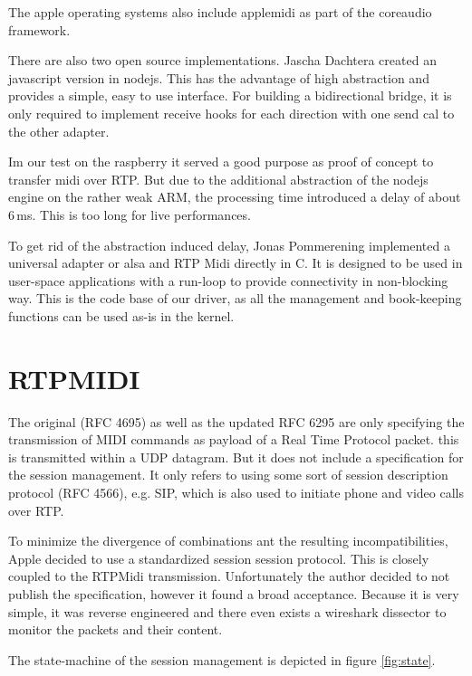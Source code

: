 \documentclass[paper=a4,fontsize=11pt,twocolumn,pagesize,bibtotoc]{scrartcl}
\begin{document}
	The apple operating systems also include applemidi as part of the coreaudio framework.
	
	There are also two open source implementations. 
	Jascha Dachtera created an javascript version in nodejs. This has the advantage of high abstraction and provides a simple, easy to use interface. For building a bidirectional bridge, it is only required to implement receive hooks for each direction with one send cal to the other adapter.
	
	Im our test on the raspberry it served a good purpose as proof of concept to transfer midi over RTP. But due to the additional abstraction of the nodejs engine on the rather weak ARM, the processing time introduced a delay of about 6\,ms. This is too long for live performances.
	
	To get rid of the abstraction induced delay, 
	 Jonas Pommerening 
	implemented a universal adapter or alsa and RTP Midi directly in C. It is designed to be used in user-space applications with a run-loop to provide connectivity in non-blocking way. This is the code base of our driver, as all the management and book-keeping functions can be used as-is in the kernel.
	
	\section{RTPMIDI}
	The original (RFC 4695) as well as the updated RFC 6295
	are only specifying the transmission of MIDI commands as payload of a Real Time Protocol packet. this is transmitted within a UDP datagram. But it does not include a specification for the session management. It only refers to using some sort of session description protocol
	(RFC 4566), e.g. SIP, which is also used to initiate phone and video calls over RTP.
	
	
	To minimize the divergence of combinations ant the resulting incompatibilities, Apple decided to use a standardized session session protocol. This is closely coupled to the RTPMidi transmission. Unfortunately the author decided to not publish the specification, however it found a broad acceptance. Because it is very simple, it was reverse engineered and there even exists a wireshark dissector to monitor the packets and their content.
	
	The state-machine of the session management is depicted in figure \ref{fig:state}.
	
\end{document}

